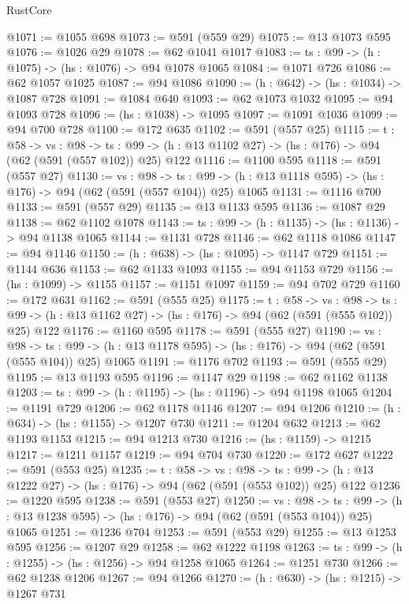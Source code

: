 \begin{lexlean}{RustCore}
\begin{coremodule}
@1071 := @1055 @698
@1073 := @591 (@559 @29)
@1075 := @13 @1073 @595
@1076 := @1026 @29
@1078 := @62 @1041 @1017
@1083 := {ts : @99} -> (h : @1075) -> (hs : @1076) -> @94 @1078 @1065
@1084 := @1071 @726
@1086 := @62 @1057 @1025
@1087 := @94 @1086
@1090 := (h : @642) -> (hs : @1034) -> @1087 @728
@1091 := @1084 @640
@1093 := @62 @1073 @1032
@1095 := @94 @1093 @728
@1096 := (hs : @1038) -> @1095
@1097 := @1091 @1036
@1099 := @94 @700 @728
@1100 := @172 @635
@1102 := @591 (@557 @25)
@1115 := {t : @58} ->
  {vs : @98} ->
  {ts : @99} -> (h : @13 @1102 @27) -> (hs : @176) -> @94 (@62 (@591 (@557 @102)) @25) @122
@1116 := @1100 @595
@1118 := @591 (@557 @27)
@1130 := {vs : @98} ->
  {ts : @99} -> (h : @13 @1118 @595) -> (hs : @176) -> @94 (@62 (@591 (@557 @104)) @25) @1065
@1131 := @1116 @700
@1133 := @591 (@557 @29)
@1135 := @13 @1133 @595
@1136 := @1087 @29
@1138 := @62 @1102 @1078
@1143 := {ts : @99} -> (h : @1135) -> (hs : @1136) -> @94 @1138 @1065
@1144 := @1131 @728
@1146 := @62 @1118 @1086
@1147 := @94 @1146
@1150 := (h : @638) -> (hs : @1095) -> @1147 @729
@1151 := @1144 @636
@1153 := @62 @1133 @1093
@1155 := @94 @1153 @729
@1156 := (hs : @1099) -> @1155
@1157 := @1151 @1097
@1159 := @94 @702 @729
@1160 := @172 @631
@1162 := @591 (@555 @25)
@1175 := {t : @58} ->
  {vs : @98} ->
  {ts : @99} -> (h : @13 @1162 @27) -> (hs : @176) -> @94 (@62 (@591 (@555 @102)) @25) @122
@1176 := @1160 @595
@1178 := @591 (@555 @27)
@1190 := {vs : @98} ->
  {ts : @99} -> (h : @13 @1178 @595) -> (hs : @176) -> @94 (@62 (@591 (@555 @104)) @25) @1065
@1191 := @1176 @702
@1193 := @591 (@555 @29)
@1195 := @13 @1193 @595
@1196 := @1147 @29
@1198 := @62 @1162 @1138
@1203 := {ts : @99} -> (h : @1195) -> (hs : @1196) -> @94 @1198 @1065
@1204 := @1191 @729
@1206 := @62 @1178 @1146
@1207 := @94 @1206
@1210 := (h : @634) -> (hs : @1155) -> @1207 @730
@1211 := @1204 @632
@1213 := @62 @1193 @1153
@1215 := @94 @1213 @730
@1216 := (hs : @1159) -> @1215
@1217 := @1211 @1157
@1219 := @94 @704 @730
@1220 := @172 @627
@1222 := @591 (@553 @25)
@1235 := {t : @58} ->
  {vs : @98} ->
  {ts : @99} -> (h : @13 @1222 @27) -> (hs : @176) -> @94 (@62 (@591 (@553 @102)) @25) @122
@1236 := @1220 @595
@1238 := @591 (@553 @27)
@1250 := {vs : @98} ->
  {ts : @99} -> (h : @13 @1238 @595) -> (hs : @176) -> @94 (@62 (@591 (@553 @104)) @25) @1065
@1251 := @1236 @704
@1253 := @591 (@553 @29)
@1255 := @13 @1253 @595
@1256 := @1207 @29
@1258 := @62 @1222 @1198
@1263 := {ts : @99} -> (h : @1255) -> (hs : @1256) -> @94 @1258 @1065
@1264 := @1251 @730
@1266 := @62 @1238 @1206
@1267 := @94 @1266
@1270 := (h : @630) -> (hs : @1215) -> @1267 @731

\end{coremodule}
\end{lexlean}
